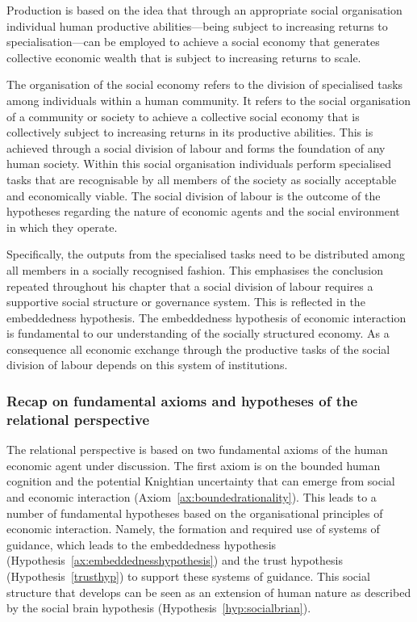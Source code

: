 \begin{hypothesis} \label{hyp:socialorganisationproduction}
Production is based on the idea that through an appropriate social organisation individual human productive abilities---being subject to increasing returns to specialisation---can be employed to achieve a social economy that generates collective economic wealth that is subject to increasing returns to scale.
\end{hypothesis}

The organisation of the social economy refers to the division of specialised tasks among individuals within a human community. It refers to the social organisation of a community or society to achieve a collective social economy that is collectively subject to increasing returns in its productive abilities. This is achieved through a social division of labour and forms the foundation of any human society. Within this social organisation individuals perform specialised tasks that are recognisable by all members of the society as socially acceptable and economically viable. The social division of labour is the outcome of the hypotheses regarding the nature of economic agents and the social environment in which they operate.

Specifically, the outputs from the specialised tasks need to be distributed among all members in a socially recognised fashion. This emphasises the conclusion repeated throughout his chapter that a social division of labour requires a supportive social structure or governance system. This is reflected in the embeddedness hypothesis. The embeddedness hypothesis of economic interaction is fundamental to our understanding of the socially structured economy. As a consequence all economic exchange through the productive tasks of the social division of labour depends on this system of institutions.

\subsubsection{Recap on fundamental axioms and hypotheses of the relational perspective}

The relational perspective is based on two fundamental axioms of the human economic agent under discussion. The first axiom is on the bounded human cognition and the potential Knightian uncertainty that can emerge from social and economic interaction (Axiom~\ref{ax:boundedrationality}). This leads to a number of fundamental hypotheses based on the organisational principles of economic interaction. Namely, the formation and required use of systems of guidance, which leads to the embeddedness hypothesis (Hypothesis~\ref{ax:embeddednesshypothesis}) and the trust hypothesis (Hypothesis~\ref{trusthyp}) to support these systems of guidance. This social structure that develops can be seen as an extension of human nature as described by the social brain hypothesis (Hypothesis~\ref{hyp:socialbrian}).


